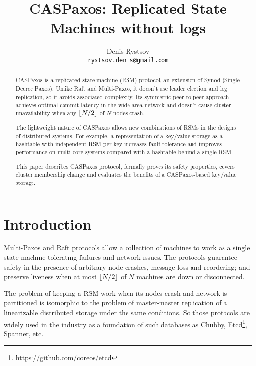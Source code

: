\documentclass[12pt]{article}
\theoremstyle{definition}
\DeclarePairedDelimiter{\floor}{\lfloor}{\rfloor}
\begin{document}
\title{CASPaxos: Replicated State Machines without logs}

\author{Denis Rystsov\\\texttt{rystsov.denis@gmail.com}}

\maketitle

\begin{abstract}
CASPaxos is a replicated state machine (RSM) protocol, an extension of Synod (Single Decree Paxos). Unlike Raft and Multi-Paxos, it doesn't use leader election and log replication, so it avoids associated complexity. Its symmetric peer-to-peer approach achieves optimal commit latency in the wide-area network and doesn't cause cluster unavailability when any $\floor{N/2}$ of $N$ nodes crash.

The lightweight nature of CASPaxos allows new combinations of RSMs in the designs of distributed systems. For example, a representation of a key/value storage as a hashtable with independent RSM per key increases fault tolerance and improves performance on multi-core systems compared with a hashtable behind a single RSM.

This paper describes CASPaxos protocol, formally proves its safety properties, covers cluster membership change and evaluates the benefits of a CASPaxos-based key/value storage.
\end{abstract}

\section{Introduction}

Multi-Paxos\cite{lamport01} and Raft\cite{raft} protocols allow a collection of machines to work as a single state machine tolerating failures and network issues. The protocols guarantee safety in the presence of arbitrary node crashes, message loss and reordering; and preserve liveness when at most $\floor{N/2}$ of $N$ machines are down or disconnected.

The problem of keeping a RSM work when its nodes crash and network is partitioned is isomorphic to the problem of master-master replication of a linearizable distributed storage under the same conditions. So those protocols are widely used in the industry as a foundation of such databases as Chubby\cite{chubby}, Etcd\footnote{\href{https://github.com/coreos/etcd}{https://github.com/coreos/etcd}}, Spanner\cite{spanner}, etc.
\end{document}
